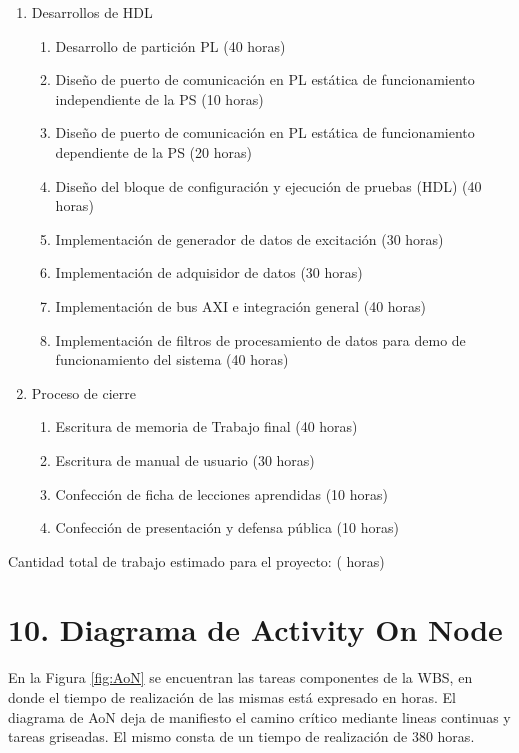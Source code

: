 \documentclass[
11pt, %
]{charter}
\begin{document}
\begin{enumerate}
	\item Desarrollos de HDL
	\begin{enumerate}
		\item Desarrollo de partición PL (40 horas)		
		\item Diseño de puerto de comunicación en PL estática de funcionamiento independiente de la PS (10 horas)
		\item Diseño de puerto de comunicación en PL estática de funcionamiento dependiente de la PS (20 horas)
		\item Diseño del bloque de configuración y ejecución de pruebas (HDL) (40 horas)
		\item Implementación de generador de datos de excitación (30 horas)
		\item Implementación de adquisidor de datos (30 horas)
		\item Implementación de bus AXI e integración general (40 horas)
		\item Implementación de filtros de procesamiento de datos para demo de funcionamiento del sistema (40 horas)
	\end{enumerate}
	
	\item Proceso de cierre
	\begin{enumerate}
		\item Escritura de memoria de Trabajo final (40 horas)
		\item Escritura de manual de usuario (30 horas)
		\item Confección de ficha de lecciones aprendidas (10 horas)
		\item Confección de presentación y defensa pública (10 horas)
	\end{enumerate}	
	
\end{enumerate}

Cantidad total de trabajo estimado para el proyecto: ({\projecteffort} horas)

\section{10. Diagrama de Activity On Node}
\label{sec:AoN}

En la Figura \ref{fig:AoN} se encuentran las tareas componentes de la WBS, en donde el tiempo de realización de las mismas está expresado en horas. El diagrama de AoN deja de manifiesto el camino crítico mediante lineas continuas y tareas griseadas. El mismo consta de un tiempo de realización de 380 horas.
\end{document}
